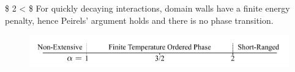 \$ 2 \textless{} \alpha \$ For quickly decaying interactions, domain walls have a finite energy penalty, hence Peirels' argument holds and there is no phase transition.

\hypertarget{fig:alpha_diagram}{%
\begin{figure}
\centering
\includegraphics[width=1\textwidth,height=\textheight]{figure_code/background_chapter/alpha_diagram}
\caption[{Long Range Ising Model Behaviour}]{}
\label{fig:alpha_diagram}
\end{figure}
}

\begin{Shaded}
\begin{Highlighting}[]

\end{Highlighting}
\end{Shaded}
